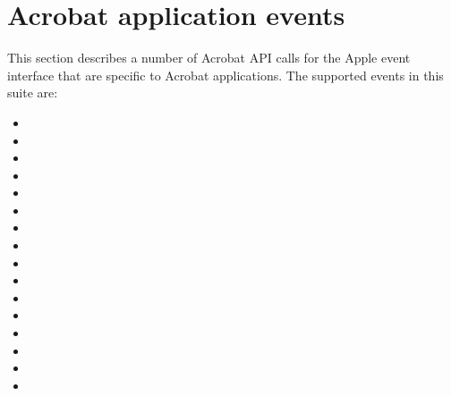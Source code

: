 \documentclass[letterpaper,12pt,english,openany,oneside]{sphinxmanual}
\begin{document}
\section{Acrobat application events}
\label{\detokenize{IAC_API_AppleEvtObjects:acrobat-application-events}}
This section describes a number of Acrobat API calls for the Apple event interface that are specific to Acrobat applications. The supported events in this suite are:
\begin{itemize}
\item {} 

\item {} 

\item {} 

\item {} 

\item {} 

\item {} 

\item {} 

\item {} 

\item {} 

\item {} 

\item {} 

\item {} 

\item {} 

\item {} 

\item {} 

\item {} 


\end{itemize}
\end{document}

